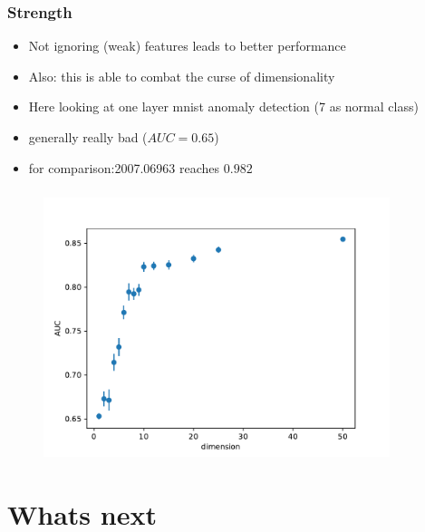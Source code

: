 \documentclass[hyperref={pdfpagelabels=false}]{beamer}
\begin{document}
\begin{frame}[label=Strength]
\frametitle{Strength}
\begin{itemize}

    \item Not ignoring (weak) features leads to better performance

    \item Also: this is able to combat the curse of dimensionality

    \item Here looking at one layer mnist anomaly detection (7 as normal class)

    \item generally really bad ($AUC = 0.65$)

    \item for comparison:2007.06963 reaches $0.982$


\end{itemize}
\end{frame}



\begin{frame}[label=]
\frametitle{}
\begin{figure}[H] 
  \centering
\includegraphics[width=0.9\textwidth]{../imgs/dimensional}
\label{fig:dimensional}
  \end{figure}


\end{frame}




\newpage
\section{Whats next}\label{sec:Whats next}
\end{document}
